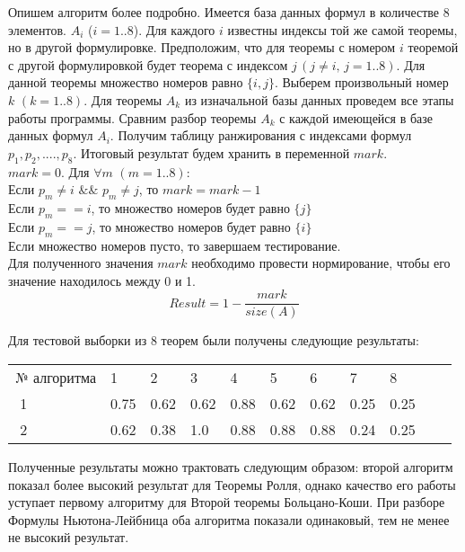 \documentclass[12pt]{article}
\begin{document}
Опишем алгоритм более подробно. Имеется база данных формул в количестве 8 элементов. $A_i$ ($i=1..8$). Для каждого $i$  известны индексы той же самой теоремы, но в другой формулировке. Предположим, что для теоремы с номером $i$ теоремой с другой формулировкой будет теорема  с индексом $j \,(j \neq i, \, j=1..8)$. Для данной теоремы множество номеров равно $\{i,j\}$. Выберем произвольный номер $k \,\, (k=1..8)$. Для теоремы $A_k$ из изначальной базы данных проведем все этапы работы программы. Сравним разбор теоремы $A_k$ с каждой имеющейся в базе данных формул $A_i$. Получим таблицу ранжирования с индексами формул $p_1,p_2,....,p_8$. Итоговый результат будем хранить в переменной $mark$.\\

$mark=0$. Для  $\forall m \,\,(m=1..8)$:\\

Если $p_m\neq i \,\, \&\& \,\, p_m \neq j$, то $mark=mark-1$\\

Если $p_m == i$, то множество номеров будет равно $\{j\}$ \\

Если $p_m == j$, то множество номеров будет равно $\{i\}$ \\

Если множество номеров пусто, то завершаем тестирование.\\

Для полученного значения $mark$ необходимо провести нормирование, чтобы его значение находилось между 0 и 1.
$$Result=1-\dfrac{mark}{size(A)}$$

Для тестовой выборки из 8 теорем были получены следующие результаты:

\begin{table}[h!]
\begin{tabular}{ l l l l l l l l  l l  l }
№ алгоритма &1 & 2 & 3 & 4 & 5 & 6 &  7 & 8 \\
\,\,1 & 0.75 & 0.62 & 0.62 & 0.88 & 0.62 & 0.62 &  0.25 & 0.25\\
\,\,2 & 0.62 & 0.38 & 1.0 & 0.88 & 0.88 &  0.88 &  0.24 & 0.25 \\
\end{tabular}
\end{table} 

Полученные результаты можно трактовать следующим образом: второй алгоритм показал более высокий результат для Теоремы Ролля, однако качество его работы уступает первому алгоритму для Второй теоремы Больцано-Коши. При разборе Формулы Ньютона-Лейбница оба алгоритма показали одинаковый, тем не менее не высокий результат.\\
 
\end{document}
